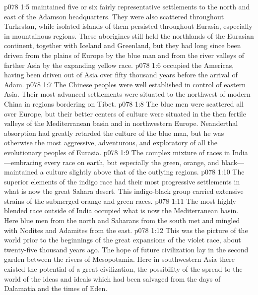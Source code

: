 \pc \vs p078 1:5 \bibnobreakspace {} maintained five or six fairly representative settlements to the north and east of the Adamson headquarters. They were also scattered throughout Turkestan, while isolated islands of them persisted throughout Eurasia, especially in mountainous regions. These aborigines still held the northlands of the Eurasian continent, together with Iceland and Greenland, but they had long since been driven from the plains of Europe by the blue man and from the river valleys of farther Asia by the expanding yellow race.
\pc \vs p078 1:6 \bibnobreakspace {} occupied the Americas, having been driven out of Asia over fifty thousand years before the arrival of Adam.
\pc \vs p078 1:7 \bibnobreakspace {} The Chinese peoples were well established in control of eastern Asia. Their most advanced settlements were situated to the northwest of modern China in regions bordering on Tibet.
\pc \vs p078 1:8 \bibnobreakspace {} The blue men were scattered all over Europe, but their better centers of culture were situated in the then fertile valleys of the Mediterranean basin and in northwestern Europe. Neanderthal absorption had greatly retarded the culture of the blue man, but he was otherwise the most aggressive, adventurous, and exploratory of all the evolutionary peoples of Eurasia.\plusone
\pc \vs p078 1:9 \bibnobreakspace {} The complex mixture of races in India---embracing every race on earth, but especially the green, orange, and black---maintained a culture slightly above that of the outlying regions.
\pc \vs p078 1:10 \bibnobreakspace {} The superior elements of the indigo race had their most progressive settlements in what is now the great Sahara desert. This indigo\hyp{}black group carried extensive strains of the submerged orange and green races.
\pc \vs p078 1:11 \bibnobreakspace {} The most highly blended race outside of India occupied what is now the Mediterranean basin. Here blue men from the north and Saharans from the south met and mingled with Nodites and Adamites from the east.
\pc \vs p078 1:12 This was the picture of the world prior to the beginnings of the great expansions of the violet race, about twenty\hyp{}five thousand years ago. The hope of future civilization lay in the second garden between the rivers of Mesopotamia. Here in southwestern Asia there existed the potential of a great civilization, the possibility of the spread to the world of the ideas and ideals which had been salvaged from the days of Dalamatia and the times of Eden.\plusone
